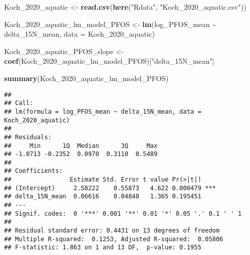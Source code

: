 \documentclass[
]{article}
\newenvironment{Shaded}{\begin{snugshade}}{\end{snugshade}}
\newcommand{\AttributeTok}[1]{\textcolor[rgb]{0.13,0.29,0.53}{#1}}
\newcommand{\FunctionTok}[1]{\textcolor[rgb]{0.13,0.29,0.53}{\textbf{#1}}}
\newcommand{\NormalTok}[1]{#1}
\newcommand{\OtherTok}[1]{\textcolor[rgb]{0.56,0.35,0.01}{#1}}
\newcommand{\SpecialCharTok}[1]{\textcolor[rgb]{0.81,0.36,0.00}{\textbf{#1}}}
\newcommand{\StringTok}[1]{\textcolor[rgb]{0.31,0.60,0.02}{#1}}
\begin{document}
\begin{Shaded}
\begin{Highlighting}[]
\NormalTok{Koch\_2020\_aquatic }\OtherTok{\textless{}{-}} \FunctionTok{read.csv}\NormalTok{(}\FunctionTok{here}\NormalTok{(}\StringTok{"Rdata"}\NormalTok{, }\StringTok{"Koch\_2020\_aquatic.csv"}\NormalTok{))}

\NormalTok{Koch\_2020\_aquatic\_lm\_model\_PFOS }\OtherTok{\textless{}{-}} \FunctionTok{lm}\NormalTok{(log\_PFOS\_mean }\SpecialCharTok{\textasciitilde{}}\NormalTok{ delta\_15N\_mean,}
                                      \AttributeTok{data =}\NormalTok{ Koch\_2020\_aquatic)}

\NormalTok{Koch\_2020\_aquatic\_PFOS\_slope }\OtherTok{\textless{}{-}} \FunctionTok{coef}\NormalTok{(Koch\_2020\_aquatic\_lm\_model\_PFOS)[}\StringTok{"delta\_15N\_mean"}\NormalTok{]}

\FunctionTok{summary}\NormalTok{(Koch\_2020\_aquatic\_lm\_model\_PFOS)}
\end{Highlighting}
\end{Shaded}

\begin{verbatim}
## 
## Call:
## lm(formula = log_PFOS_mean ~ delta_15N_mean, data = Koch_2020_aquatic)
## 
## Residuals:
##     Min      1Q  Median      3Q     Max 
## -1.0713 -0.2352  0.0970  0.3110  0.5489 
## 
## Coefficients:
##                Estimate Std. Error t value Pr(>|t|)    
## (Intercept)     2.58222    0.55873   4.622 0.000479 ***
## delta_15N_mean  0.06616    0.04848   1.365 0.195451    
## ---
## Signif. codes:  0 '***' 0.001 '**' 0.01 '*' 0.05 '.' 0.1 ' ' 1
## 
## Residual standard error: 0.4431 on 13 degrees of freedom
## Multiple R-squared:  0.1253, Adjusted R-squared:  0.05806 
## F-statistic: 1.863 on 1 and 13 DF,  p-value: 0.1955
\end{verbatim}
\end{document}
